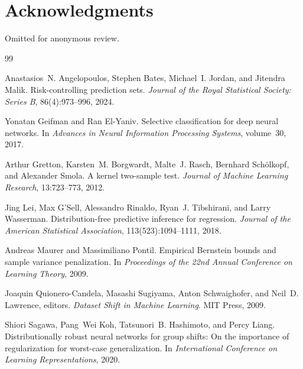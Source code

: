 \section*{Acknowledgments}

Omitted for anonymous review.

\begin{thebibliography}{99}

Anastasios~N. Angelopoulos, Stephen Bates, Michael~I. Jordan, and Jitendra Malik.
\newblock Risk-controlling prediction sets.
\newblock \emph{Journal of the Royal Statistical Society: Series B},
  86(4):973--996, 2024.

Yonatan Geifman and Ran El-Yaniv.
\newblock Selective classification for deep neural networks.
\newblock In \emph{Advances in Neural Information Processing Systems}, volume~30,
  2017.

Arthur Gretton, Karsten~M. Borgwardt, Malte~J. Rasch, Bernhard Sch\"olkopf, and
  Alexander Smola.
\newblock A kernel two-sample test.
\newblock \emph{Journal of Machine Learning Research}, 13:723--773, 2012.

Jing Lei, Max G'Sell, Alessandro Rinaldo, Ryan~J. Tibshirani, and Larry Wasserman.
\newblock Distribution-free predictive inference for regression.
\newblock \emph{Journal of the American Statistical Association},
  113(523):1094--1111, 2018.

Andreas Maurer and Massimiliano Pontil.
\newblock Empirical Bernstein bounds and sample variance penalization.
\newblock In \emph{Proceedings of the 22nd Annual Conference on Learning Theory},
  2009.

Joaquin Quionero-Candela, Masashi Sugiyama, Anton Schwaighofer, and
  Neil~D. Lawrence, editors.
\newblock \emph{Dataset Shift in Machine Learning}.
\newblock MIT Press, 2009.

Shiori Sagawa, Pang~Wei Koh, Tatsunori~B. Hashimoto, and Percy Liang.
\newblock Distributionally robust neural networks for group shifts: On the
  importance of regularization for worst-case generalization.
\newblock In \emph{International Conference on Learning Representations}, 2020.


\end{thebibliography}
